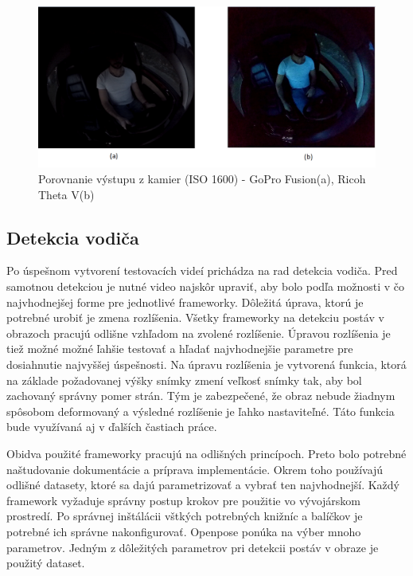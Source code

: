 \documentclass[slovak,master,dept460,male,cpp,cpdeclaration]{diploma}
\begin{document}
\begin{figure}[H]
	\centering
	\includegraphics[width=1\textwidth]{Figures/camCompare.png}
	\caption{Porovnanie výstupu z kamier (ISO 1600) - GoPro Fusion(a), Ricoh Theta V(b)}
	\label{fig:cameraCompare}
\end{figure}



\newpage
\subsection{Detekcia vodiča}
\label{sec:driverDetection}
Po úspešnom vytvorení testovacích videí prichádza na rad detekcia vodiča. Pred samotnou detekciou je nutné video najskôr upraviť, aby bolo podľa možnosti v čo najvhodnejšej forme pre jednotlivé frameworky. Dôležitá úprava, ktorú je potrebné urobiť je zmena rozlíšenia. Všetky frameworky na detekciu postáv v obrazoch pracujú odlišne vzhľadom na zvolené rozlíšenie. Úpravou rozlíšenia je tiež možné možné ľahšie testovať a hľadať najvhodnejšie parametre pre dosiahnutie  najvyššej úspešnosti. Na úpravu rozlíšenia je vytvorená funkcia, ktorá na základe požadovanej výšky  snímky  zmení veľkosť  snímky tak, aby bol zachovaný správny pomer strán. Tým je zabezpečené, že obraz nebude žiadnym spôsobom deformovaný a výsledné rozlíšenie je ľahko nastaviteľné. Táto funkcia bude využívaná aj v ďalších častiach práce.\par
Obidva použité frameworky pracujú na odlišných princípoch. Preto bolo potrebné naštudovanie dokumentácie a príprava implementácie. Okrem toho používajú odlišné datasety, ktoré sa dajú parametrizovať a vybrať ten najvhodnejší. Každý framework  vyžaduje správny postup krokov pre použitie vo vývojárskom prostredí. Po správnej inštálácii vštkých potrebných knižníc a balíčkov  je potrebné ich správne nakonfigurovať. Openpose ponúka na výber mnoho parametrov. Jedným z dôležitých parametrov pri detekcii postáv v obraze je použitý dataset.
\end{document}
